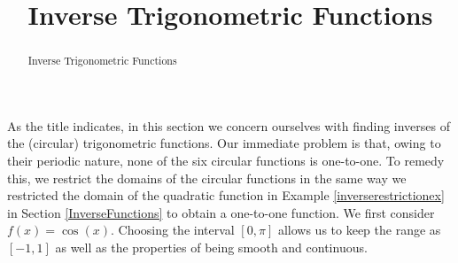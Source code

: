 \documentclass[12pt]{ximera}
\title{Inverse Trigonometric Functions}
\begin{document}
\begin{abstract} 
Inverse Trigonometric Functions
\end{abstract}

\maketitle

\setcounter{footnote}{0}

\label{ArcTrig}

As the title indicates, in this section we concern ourselves with finding inverses of the (circular) trigonometric functions.  Our immediate problem is that, owing to their periodic nature, none of the six circular functions is  one-to-one. To remedy this, we restrict the domains of the circular functions in the same way we restricted the domain of the quadratic function in Example \ref{inverserestrictionex} in Section \ref{InverseFunctions} to obtain a one-to-one function.  We first consider $f(x) = \cos(x)$. Choosing the interval $[0,\pi]$ allows us to keep the range as $[-1,1]$ as well as the properties of being smooth and continuous.

\begin{center}



\end{center} 
\end{document}
